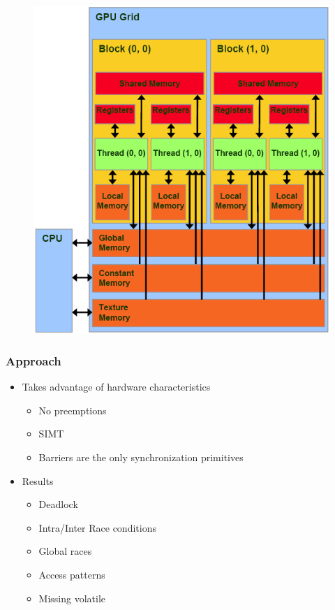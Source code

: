 \documentclass{beamer}
\begin{document}
	\begin{frame}
		\begin{figure}[htbp]
			\centering
			\includegraphics[scale=0.4]{CUDA-memory-model}
		\end{figure}
	\end{frame}
	
	\begin{frame}
		\frametitle{Approach}
		\begin{itemize}
			\item Takes advantage of hardware characteristics
			\begin{itemize}
				\item No preemptions
				\item SIMT
				\item Barriers are the only synchronization primitives
			\end{itemize}
			\item Results
			\begin{itemize}
				\item Deadlock
				\item Intra/Inter Race conditions
				\item Global races
				\item Access patterns
				\item Missing volatile
			\end{itemize}
		\end{itemize}
	\end{frame}
	
\end{document}
